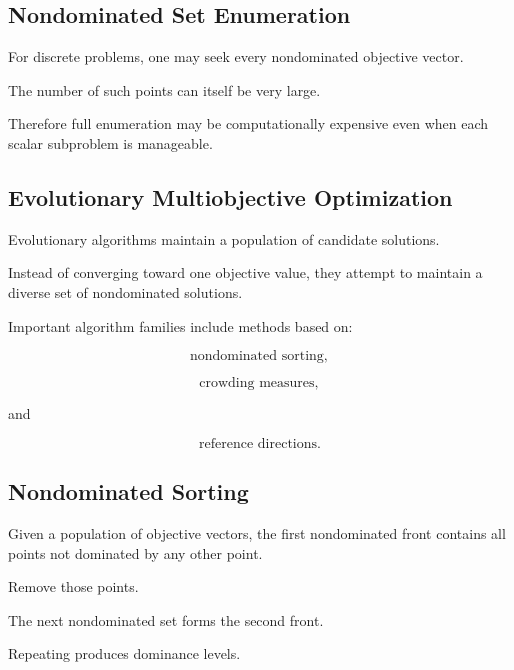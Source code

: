 \subsection{Nondominated Set Enumeration}
\label{subsec:nondominated-set-enumeration}

For discrete problems, one may seek every nondominated objective vector.

The number of such points can itself be very large.

Therefore full enumeration may be computationally expensive even when
each scalar subproblem is manageable.

\subsection{Evolutionary Multiobjective Optimization}
\label{subsec:evolutionary-multiobjective-optimization}

Evolutionary algorithms maintain a population of candidate solutions.

Instead of converging toward one objective value, they attempt to maintain
a diverse set of nondominated solutions.

Important algorithm families include methods based on:

\[
\boxed{
\text{nondominated sorting},
}
\]

\[
\boxed{
\text{crowding measures},
}
\]

and

\[
\boxed{
\text{reference directions}.
}
\]

\subsection{Nondominated Sorting}
\label{subsec:nondominated-sorting}

Given a population of objective vectors, the first nondominated front
contains all points not dominated by any other point.

Remove those points.

The next nondominated set forms the second front.

Repeating produces dominance levels.


